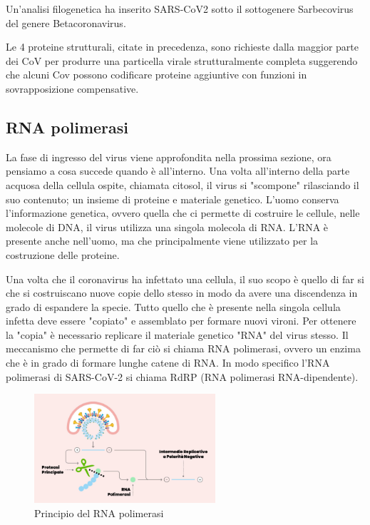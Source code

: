 Un'analisi filogenetica ha inserito SARS-CoV2 sotto il sottogenere Sarbecovirus del genere Betacoronavirus. 

Le 4 proteine strutturali, citate in precedenza, sono richieste dalla maggior parte dei CoV per produrre una particella virale strutturalmente completa suggerendo che alcuni Cov possono codificare proteine aggiuntive con funzioni in sovrapposizione compensative.

\subsection{RNA polimerasi}\label{subsec:es_subsec}
La fase di ingresso del virus viene approfondita nella prossima sezione, ora pensiamo a cosa succede quando è all'interno. Una volta all'interno della parte acquosa della cellula ospite, chiamata citosol, il virus si "scompone" rilasciando il suo contenuto; un insieme di proteine e materiale genetico. L'uomo conserva l'informazione genetica, ovvero quella che ci permette di costruire le cellule, nelle molecole di DNA, il virus utilizza una singola molecola di RNA. L'RNA è presente anche nell'uomo, ma che principalmente viene utilizzato per la costruzione delle proteine. 

Una volta che il coronavirus ha infettato una cellula, il suo scopo è quello di far si che si costruiscano nuove copie dello stesso in modo da avere una discendenza in grado di espandere la specie. Tutto quello che è presente nella singola cellula infetta deve essere "copiato" e assemblato per formare nuovi vironi. Per ottenere la "copia" è necessario replicare il materiale genetico "RNA" del virus stesso. Il meccanismo che permette di far ciò si chiama RNA polimerasi, ovvero un enzima che è in grado di formare lunghe catene di RNA. In modo specifico l'RNA polimerasi di SARS-CoV-2 si chiama RdRP (RNA polimerasi RNA-dipendente). 

\begin{figure}
	\centering
	\includegraphics[width=0.6\textwidth]{Immagini/RNA_polimerasi.png}
	\caption{Principio del RNA polimerasi}
	\label{fig:Amminoacido}
\end{figure}

